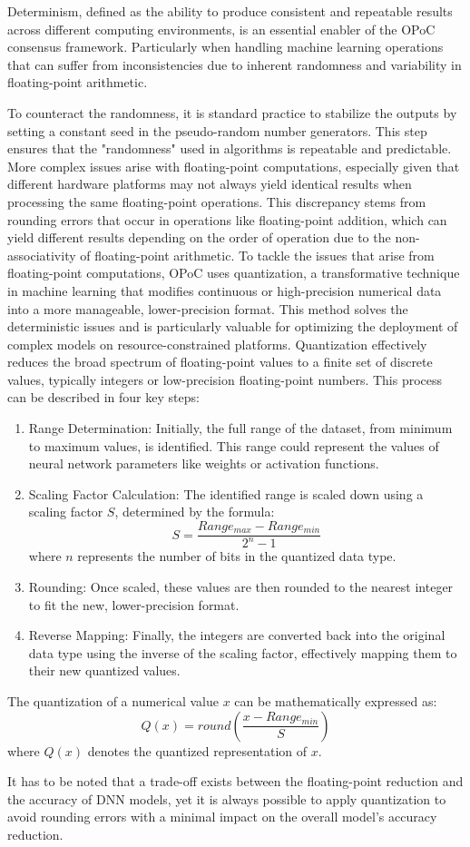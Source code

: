 \documentclass{article}
\begin{document}
Determinism, defined as the ability to produce consistent and repeatable results across different computing environments, is an essential enabler of the OPoC consensus framework. Particularly when handling machine learning operations that can suffer from inconsistencies due to inherent randomness and variability in floating-point arithmetic.

To counteract the randomness, it is standard practice to stabilize the outputs by setting a constant seed in the pseudo-random number generators. This step ensures that the "randomness" used in algorithms is repeatable and predictable. 
More complex issues arise with floating-point computations, especially given that different hardware platforms may not always yield identical results when processing the same floating-point operations. This discrepancy stems from rounding errors that occur in operations like floating-point addition, which can yield different results depending on the order of operation due to the non-associativity of floating-point arithmetic.    
To tackle the issues that arise from floating-point computations, OPoC uses quantization, a transformative technique in machine learning that modifies continuous or high-precision numerical data into a more manageable, lower-precision format. This method solves the deterministic issues and is particularly valuable for optimizing the deployment of complex models on resource-constrained platforms.
Quantization effectively reduces the broad spectrum of floating-point values to a finite set of discrete values, typically integers or low-precision floating-point numbers. This process can be described in four key steps:

\begin{enumerate}


\item Range Determination: Initially, the full range of the dataset, from minimum to maximum values, is identified. This range could represent the values of neural network parameters like weights or activation functions.
\item Scaling Factor Calculation: The identified range is scaled down using a scaling factor \( S \), determined by the formula:
   \[
   S = \frac{Range_{max} - Range_{min}}{2^n - 1}
   \]
   where \( n \) represents the number of bits in the quantized data type.
\item Rounding: Once scaled, these values are then rounded to the nearest integer to fit the new, lower-precision format.
\item Reverse Mapping: Finally, the integers are converted back into the original data type using the inverse of the scaling factor, effectively mapping them to their new quantized values.
\end{enumerate}

The quantization of a numerical value \( x \) can be mathematically expressed as:
\[
Q(x) = round\left(\frac{x - Range_{min}}{S}\right)
\]
where \( Q(x) \) denotes the quantized representation of \( x \).

It has to be noted that a trade-off exists between the floating-point reduction and the accuracy of DNN models, yet it is always possible to apply quantization to avoid rounding errors with a minimal impact on the overall model’s accuracy reduction. 
\end{document}
